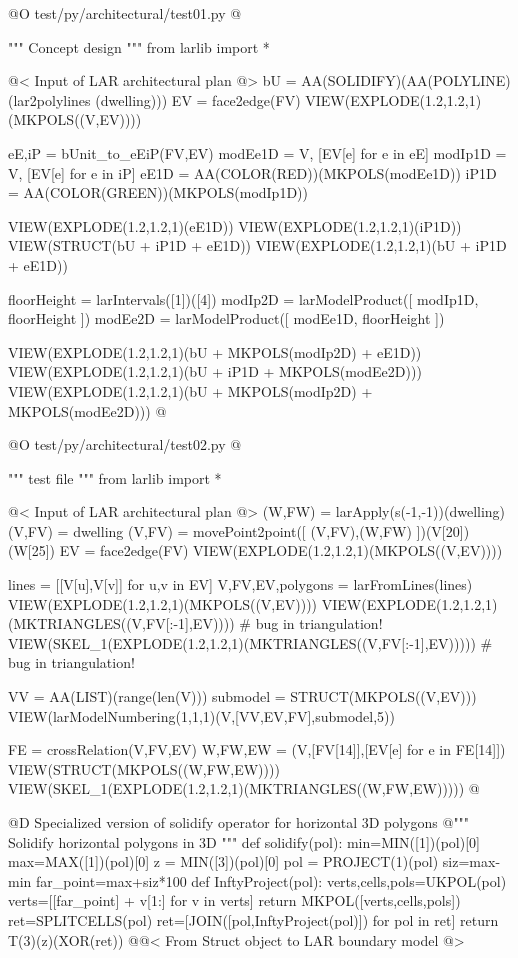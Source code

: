 \documentclass[11pt,oneside]{article}    %
\begin{document}
@O test/py/architectural/test01.py
@{""" Concept design """
from larlib import *

@< Input of LAR architectural plan @>
bU = AA(SOLIDIFY)(AA(POLYLINE)(lar2polylines (dwelling)))
EV = face2edge(FV)
VIEW(EXPLODE(1.2,1.2,1)(MKPOLS((V,EV))))

eE,iP = bUnit_to_eEiP(FV,EV)
modEe1D = V, [EV[e] for e in eE]
modIp1D = V, [EV[e] for e in iP]
eE1D = AA(COLOR(RED))(MKPOLS(modEe1D))
iP1D = AA(COLOR(GREEN))(MKPOLS(modIp1D))

VIEW(EXPLODE(1.2,1.2,1)(eE1D))
VIEW(EXPLODE(1.2,1.2,1)(iP1D))
VIEW(STRUCT(bU + iP1D + eE1D))
VIEW(EXPLODE(1.2,1.2,1)(bU + iP1D + eE1D))

floorHeight = larIntervals([1])([4])
modIp2D = larModelProduct([ modIp1D, floorHeight ])
modEe2D = larModelProduct([ modEe1D, floorHeight ])

VIEW(EXPLODE(1.2,1.2,1)(bU + MKPOLS(modIp2D) + eE1D))
VIEW(EXPLODE(1.2,1.2,1)(bU + iP1D + MKPOLS(modEe2D)))
VIEW(EXPLODE(1.2,1.2,1)(bU + MKPOLS(modIp2D) + MKPOLS(modEe2D)))
@}



@O test/py/architectural/test02.py
@{""" test file """
from larlib import *

@< Input of LAR architectural plan @>
(W,FW) = larApply(s(-1,-1))(dwelling)
(V,FV) = dwelling
(V,FV) = movePoint2point([ (V,FV),(W,FW) ])(V[20])(W[25])
EV = face2edge(FV)
VIEW(EXPLODE(1.2,1.2,1)(MKPOLS((V,EV))))

lines = [[V[u],V[v]] for u,v in EV]
V,FV,EV,polygons = larFromLines(lines)
VIEW(EXPLODE(1.2,1.2,1)(MKPOLS((V,EV))))
VIEW(EXPLODE(1.2,1.2,1)(MKTRIANGLES((V,FV[:-1],EV)))) # bug in triangulation!
VIEW(SKEL_1(EXPLODE(1.2,1.2,1)(MKTRIANGLES((V,FV[:-1],EV))))) # bug in triangulation!

VV = AA(LIST)(range(len(V)))
submodel = STRUCT(MKPOLS((V,EV)))
VIEW(larModelNumbering(1,1,1)(V,[VV,EV,FV],submodel,5))

FE = crossRelation(V,FV,EV)
W,FW,EW = (V,[FV[14]],[EV[e] for e in FE[14]])
VIEW(STRUCT(MKPOLS((W,FW,EW))))
VIEW(SKEL_1(EXPLODE(1.2,1.2,1)(MKTRIANGLES((W,FW,EW)))))
@}



@D Specialized version of solidify operator for horizontal 3D polygons
@{""" Solidify horizontal polygons in 3D """
def solidify(pol):    
    min=MIN([1])(pol)[0]
    max=MAX([1])(pol)[0]
    z = MIN([3])(pol)[0]
    pol = PROJECT(1)(pol)
    siz=max-min
    far_point=max+siz*100 
    def InftyProject(pol):
        verts,cells,pols=UKPOL(pol)
        verts=[[far_point] + v[1:] for v in verts]
        return MKPOL([verts,cells,pols])  
    ret=SPLITCELLS(pol)
    ret=[JOIN([pol,InftyProject(pol)]) for pol in ret]
    return T(3)(z)(XOR(ret))
@}@< From Struct object to LAR boundary model @>
\end{document}
